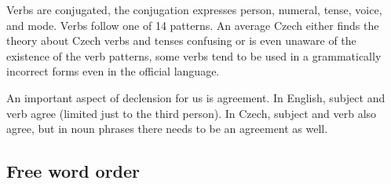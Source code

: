 Verbs are conjugated, the conjugation expresses person, numeral, tense, voice, and mode. Verbs follow one of 14 patterns. An average Czech either finds the theory about Czech verbs and tenses confusing or is even unaware of the existence of the verb patterns, some verbs tend to be used in a grammatically incorrect forms even in the official language.

An important aspect of declension for us is agreement. In English, subject and verb agree (limited just to the third person). In Czech, subject and verb also agree, but in noun phrases there needs to be an agreement as well.  

\subsection{Free word order}

